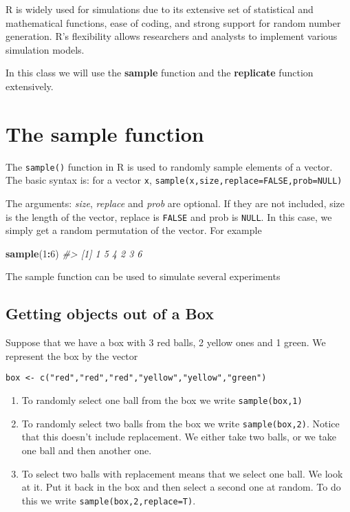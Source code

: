 \documentclass[
]{book}
\newenvironment{Shaded}{\begin{snugshade}}{\end{snugshade}}
\newcommand{\CommentTok}[1]{\textcolor[rgb]{0.56,0.35,0.01}{\textit{#1}}}
\newcommand{\DecValTok}[1]{\textcolor[rgb]{0.00,0.00,0.81}{#1}}
\newcommand{\FunctionTok}[1]{\textcolor[rgb]{0.13,0.29,0.53}{\textbf{#1}}}
\newcommand{\NormalTok}[1]{#1}
\newcommand{\SpecialCharTok}[1]{\textcolor[rgb]{0.81,0.36,0.00}{\textbf{#1}}}
\providecommand{\tightlist}{%
  \setlength{\itemsep}{0pt}\setlength{\parskip}{0pt}}
\theoremstyle{definition}
\theoremstyle{definition}
\theoremstyle{definition}
\theoremstyle{definition}
\theoremstyle{remark}
\begin{document}
R is widely used for simulations due to its extensive set of statistical and mathematical functions, ease of coding, and strong support for random number generation. R's flexibility allows researchers and analysts to implement various simulation models.

In this class we will use the \textbf{sample} function and the \textbf{replicate} function extensively.

\hypertarget{the-sample-function}{%
\section{The sample function}\label{the-sample-function}}

The \texttt{sample()} function in R is used to randomly sample elements of a vector.
The basic syntax is: for a vector \texttt{x}, \texttt{sample(x,size,replace=FALSE,prob=NULL)}

The arguments: \emph{size}, \emph{replace} and \emph{prob} are optional. If they are not included, size is the length of the vector, replace is \texttt{FALSE} and prob is \texttt{NULL}. In this case, we simply get a random permutation of the vector. For example

\begin{Shaded}
\begin{Highlighting}[]
\FunctionTok{sample}\NormalTok{(}\DecValTok{1}\SpecialCharTok{:}\DecValTok{6}\NormalTok{)}
\CommentTok{\#\textgreater{} [1] 1 5 4 2 3 6}
\end{Highlighting}
\end{Shaded}

The sample function can be used to simulate several experiments

\hypertarget{getting-objects-out-of-a-box}{%
\subsection*{Getting objects out of a Box}\label{getting-objects-out-of-a-box}}

Suppose that we have a box with 3 red balls, 2 yellow ones and 1 green. We represent the box by the vector

\begin{verbatim}
box <- c("red","red","red","yellow","yellow","green")
\end{verbatim}

\begin{enumerate}
\def\labelenumi{\arabic{enumi}.}
\tightlist
\item
  To randomly select one ball from the box we write \texttt{sample(box,1)}
\item
  To randomly select two balls from the box we write \texttt{sample(box,2)}. Notice that this doesn't include replacement. We either take two balls, or we take one ball and then another one.
\item
  To select two balls with replacement means that we select one ball. We look at it. Put it back in the box and then select a second one at random. To do this we write \texttt{sample(box,2,replace=T)}.
\end{enumerate}
\end{document}
